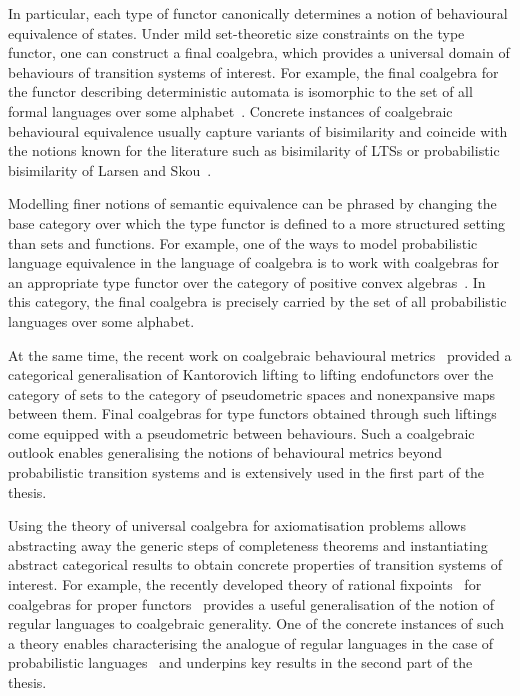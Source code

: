 In particular, each type of functor canonically determines a notion of behavioural equivalence of states. Under mild set-theoretic size constraints on the type functor, one can construct a final coalgebra, which provides a universal domain of behaviours of transition systems of interest. For example, the final coalgebra for the functor describing deterministic automata is isomorphic to the set of all formal languages over some alphabet~\cite{Rutten:2000:Universal}. Concrete instances of coalgebraic behavioural equivalence usually capture variants of bisimilarity and coincide with the notions known for the literature such as bisimilarity of LTSs or probabilistic bisimilarity of Larsen and Skou~\cite{Vink:1999:Bisimulation}.  
		
	Modelling finer notions of semantic equivalence can be phrased by changing the base category over which the type functor is defined to a more structured setting than sets and functions. For example, one of the ways to model probabilistic language equivalence in the language of coalgebra is to work with coalgebras for an appropriate type functor over the category of positive convex algebras~\cite{Silva:2010:Generalizing,Silva:2011:Sound}. In this category, the final coalgebra is precisely carried by the set of all probabilistic languages over some alphabet. 	 

At the same time, the recent work on coalgebraic behavioural metrics~\cite{Baldan:2018:Coalgebraic} provided a categorical generalisation of Kantorovich lifting to lifting endofunctors over the category of sets to the category of pseudometric spaces and nonexpansive maps between them. Final coalgebras for type functors obtained through such liftings come equipped with a pseudometric between behaviours. Such a coalgebraic outlook enables generalising the notions of behavioural metrics beyond probabilistic transition systems and is extensively used in the first part of the thesis.

Using the theory of universal coalgebra for axiomatisation problems allows abstracting away the generic steps of completeness theorems and instantiating abstract categorical results to obtain concrete properties of transition systems of interest. For example, the recently developed theory of rational fixpoints~\cite{Milius:2010:Sound} for coalgebras for proper functors~\cite{Milius:2018:Proper} provides a useful generalisation of the notion of regular languages to coalgebraic generality. One of the concrete instances of such a theory enables characterising the analogue of regular languages in the case of probabilistic languages~\cite{Sokolova:2018:Proper} and underpins key results in the second part of the thesis.


